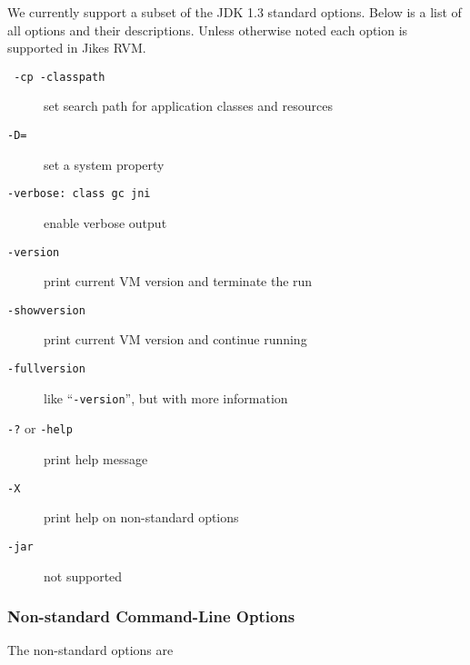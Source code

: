 We currently support a subset of the JDK 1.3 standard options.  Below
is a list of all options and their descriptions.  Unless otherwise noted each
option is supported in Jikes RVM.
\begin{description}
\item[{\tt \Mlbr{} -cp \Mor{} -classpath \Mrbr{} }]
set search path for application classes and resources

\item[{\tt -D=}] set a system property

\item[{\tt -verbose:\Mlsq{} class \Mor{} gc \Mor{} jni \Mrsq}]
enable verbose output

\item[{\tt -version}] print current VM version and terminate the run

\item[{\tt -showversion}] print current VM version and continue running

\item[{\tt -fullversion}] like ``{\tt -version}'', but with more information

\item[{\tt -?} or {\tt -help}] print help message

\item[{\tt -X}] print help on non-standard options

\item[{\tt -jar}] not supported

\end{description}

\subsubsection{Non-standard Command-Line Options}

The non-standard options are

